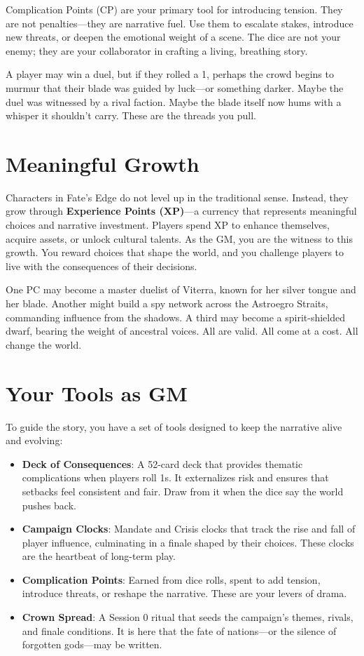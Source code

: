 Complication Points (CP) are your primary tool for introducing tension. They are not penalties—they are narrative fuel. Use them to escalate stakes, introduce new threats, or deepen the emotional weight of a scene. The dice are not your enemy; they are your collaborator in crafting a living, breathing story.

A player may win a duel, but if they rolled a 1, perhaps the crowd begins to murmur that their blade was guided by luck—or something darker. Maybe the duel was witnessed by a rival faction. Maybe the blade itself now hums with a whisper it shouldn’t carry. These are the threads you pull.

\section*{Meaningful Growth}

Characters in Fate’s Edge do not level up in the traditional sense. Instead, they grow through \textbf{Experience Points (XP)}—a currency that represents meaningful choices and narrative investment. Players spend XP to enhance themselves, acquire assets, or unlock cultural talents. As the GM, you are the witness to this growth. You reward choices that shape the world, and you challenge players to live with the consequences of their decisions.

One PC may become a master duelist of Viterra, known for her silver tongue and her blade. Another might build a spy network across the Astroegro Straits, commanding influence from the shadows. A third may become a spirit-shielded dwarf, bearing the weight of ancestral voices. All are valid. All come at a cost. All change the world.

\section*{Your Tools as GM}

To guide the story, you have a set of tools designed to keep the narrative alive and evolving:

\begin{itemize}
    \item \textbf{Deck of Consequences}: A 52-card deck that provides thematic complications when players roll 1s. It externalizes risk and ensures that setbacks feel consistent and fair. Draw from it when the dice say the world pushes back.
    \item \textbf{Campaign Clocks}: Mandate and Crisis clocks that track the rise and fall of player influence, culminating in a finale shaped by their choices. These clocks are the heartbeat of long-term play.
    \item \textbf{Complication Points}: Earned from dice rolls, spent to add tension, introduce threats, or reshape the narrative. These are your levers of drama.
    \item \textbf{Crown Spread}: A Session 0 ritual that seeds the campaign’s themes, rivals, and finale conditions. It is here that the fate of nations—or the silence of forgotten gods—may be written.
\end{itemize}
